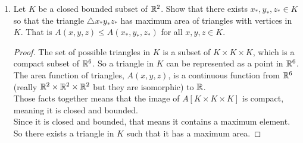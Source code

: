 \documentclass[14pt]{extarticle}
\begin{document}
\begin{enumerate}
		\item Let $K$ be a closed bounded subset of $\mathbb{R}^2$. Show that there exists $x_*,y_*,z_* \in K$ so that the triangle $\triangle x_*y_*z_*$ has maximum area of triangles with vertices in $K$. That is $A(x,y,z) \leq A(x_*,y_*,z_*)$ for all $x,y,z \in K$.
		\begin{proof}
			The set of possible triangles in $K$ is a subset of $K \times K \times K$, which is a compact subset of $\mathbb{R}^6$. So a triangle in $K$ can be represented as a point in $\mathbb{R}^6$.\\
			The area function of triangles, $A(x,y,z)$, is a continuous function from $\mathbb{R}^6$ (really $\mathbb{R}^2\times\mathbb{R}^2\times\mathbb{R}^2$ but they are isomorphic) to $\mathbb{R}$.\\
			Those facts together means that the image of $A[K \times K \times K]$ is compact, meaning it is closed and bounded.\\
			Since it is closed and bounded, that means it contains a maximum element.\\
			So there exists a triangle in $K$ such that it has a maximum area.
		\end{proof}
	\end{enumerate}
\end{document}
